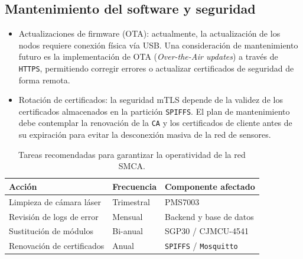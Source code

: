 \subsection{Mantenimiento del software y seguridad}

\begin{itemize}
    \item Actualizaciones de firmware (OTA): actualmente, la actualización de los nodos requiere conexión física vía USB. Una consideración de mantenimiento futuro es la implementación de OTA (\textit{Over-the-Air updates}) a través de \texttt{HTTPS}, permitiendo corregir errores o actualizar certificados de seguridad de forma remota.
    \item Rotación de certificados: la seguridad mTLS depende de la validez de los certificados almacenados en la partición \texttt{SPIFFS}. El plan de mantenimiento debe contemplar la renovación de la \texttt{CA} y los certificados de cliente antes de su expiración para evitar la desconexión masiva de la red de sensores.
\end{itemize}

\begin{table}[h]
    \centering
    \caption[Plan de mantenimiento preventivo sugerido]{Tareas recomendadas para garantizar la operatividad de la red SMCA.}
    \label{tab:mantenimiento}
    \begin{tabular}{p{4cm} p{3.5cm} p{4cm}}
        \toprule
        \textbf{Acción} & \textbf{Frecuencia} & \textbf{Componente afectado} \\
        \midrule
        Limpieza de cámara láser & Trimestral & PMS7003 \\
        Revisión de logs de error & Mensual & Backend y base de datos \\
        Sustitución de módulos & Bi-anual & SGP30 / CJMCU-4541 \\
        Renovación de certificados & Anual & \texttt{SPIFFS} / \texttt{Mosquitto} \\
        \bottomrule
    \end{tabular}
\end{table}